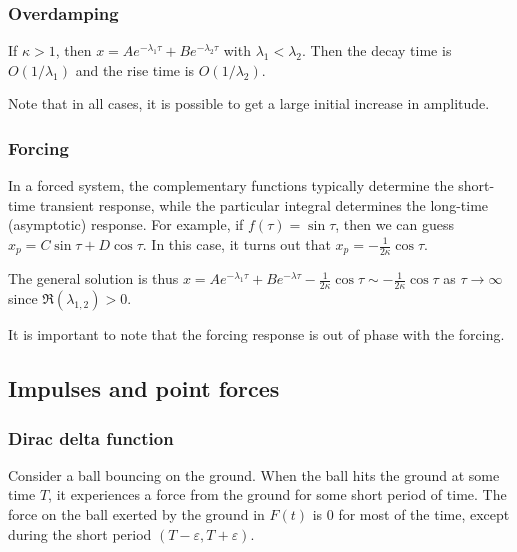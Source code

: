 \documentclass[a4paper]{article}
\begin{document}
\subsubsection*{Overdamping}
If $\kappa > 1$, then $x = Ae^{-\lambda_1\tau} + Be^{-\lambda_2\tau}$ with $\lambda_1 < \lambda_2$. Then the decay time is $O(1/\lambda_1)$ and the rise time is $O(1/\lambda_2)$.
\begin{center}
\end{center}
Note that in all cases, it is possible to get a large initial increase in amplitude.

\subsubsection*{Forcing}
In a forced system, the complementary functions typically determine the short-time transient response, while the particular integral determines the long-time (asymptotic) response.
For example, if $f(\tau) = \sin\tau$, then we can guess $x_p = C\sin \tau + D\cos\tau$. In this case, it turns out that $x_p = -\frac{1}{2\kappa}\cos\tau$.

The general solution is thus $x = Ae^{-\lambda_1\tau} + Be^{-\lambda \tau} - \frac{1}{2\kappa}\cos\tau \sim -\frac{1}{2\kappa}\cos\tau$ as $\tau\to \infty$ since $\Re (\lambda_{1, 2}) > 0$.

It is important to note that the forcing response is out of phase with the forcing.
\subsection{Impulses and point forces}
\subsubsection{Dirac delta function}
Consider a ball bouncing on the ground. When the ball hits the ground at some time $T$, it experiences a force from the ground for some short period of time. The force on the ball exerted by the ground in $F(t)$ is $0$ for most of the time, except during the short period $(T - \varepsilon, T + \varepsilon)$.
\end{document}
